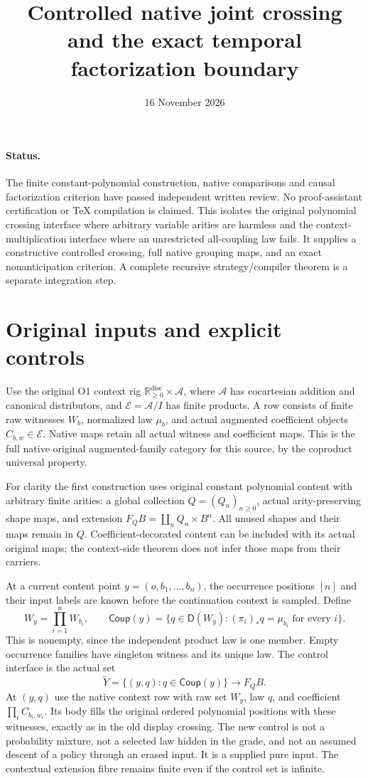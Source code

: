 \documentclass[11pt]{article}
\title{Controlled native joint crossing and the exact temporal factorization boundary}
\date{16 November 2026}
\begin{document}
\maketitle
\paragraph{Status.} The finite constant-polynomial construction, native comparisons and causal factorization criterion have passed independent written review. No proof-assistant certification or TeX compilation is claimed. This isolates the original polynomial crossing interface where arbitrary variable arities are harmless and the context-multiplication interface where an unrestricted all-coupling law fails. It supplies a constructive controlled crossing, full native grouping maps, and an exact nonanticipation criterion. A complete recursive strategy/compiler theorem is a separate integration step.

\section{Original inputs and explicit controls}
Use the original O1 context rig $\mathbb R_{\ge0}^{\mathrm{disc}}\times\mathcal A$, where $\mathcal A$ has cocartesian addition and canonical distributors, and $\mathcal E=\mathcal A/I$ has finite products. A row consists of finite raw witnesses $W_b$, normalized law $\mu_b$, and actual augmented coefficient objects $C_{b,w}\in\mathcal E$. Native maps retain all actual witness and coefficient maps. This is the full native original augmented-family category for this source, by the coproduct universal property.

For clarity the first construction uses original constant polynomial content with arbitrary finite arities: a global collection $Q=(Q_n)_{n\ge0}$, actual arity-preserving shape maps, and extension $F_QB=\coprod_n Q_n\times B^n$. All unused shapes and their maps remain in $Q$. Coefficient-decorated content can be included with its actual original maps; the context-side theorem does not infer those maps from their carriers.

At a current content point $y=(o,b_1,\ldots,b_n)$, the occurrence positions $[n]$ and their input labels are known before the continuation context is sampled. Define
\[
 W_y=\prod_{i=1}^n W_{b_i},\qquad
 \mathsf{Coup}(y)=\{q\in\mathsf D(W_y): (\pi_i)_*q=\mu_{b_i}\text{ for every }i\}.
\]
This is nonempty, since the independent product law is one member. Empty occurrence families have singleton witness and its unique law. The control interface is the actual set
\[
 \widetilde Y=\{(y,q):q\in\mathsf{Coup}(y)\}\longrightarrow F_QB.
\]
At $(y,q)$ use the native context row with raw set $W_y$, law $q$, and coefficient $\prod_i C_{b_i,w_i}$. Its body fills the original ordered polynomial positions with these witnesses, exactly as in the old display crossing. The new control is not a probability mixture, not a selected law hidden in the grade, and not an assumed descent of a policy through an erased input. It is a supplied pure input. The contextual extension fibre remains finite even if the control set is infinite.
\end{document}
